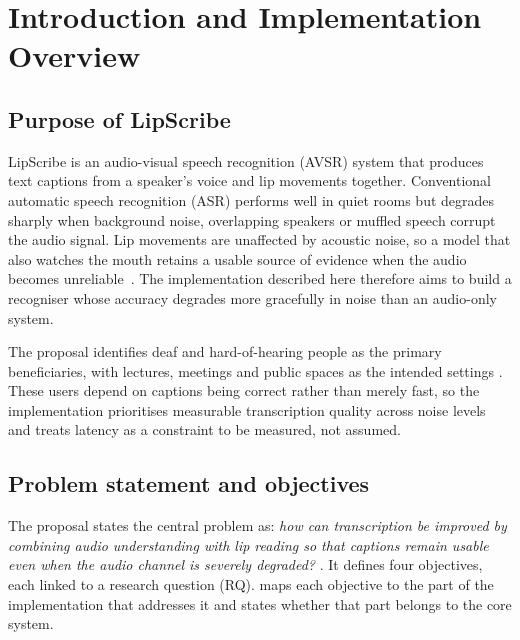 \section{Introduction and Implementation Overview}
\label{sec:intro}

\subsection{Purpose of LipScribe}
LipScribe is an audio-visual speech recognition (AVSR) system that produces
text captions from a speaker's voice and lip movements together. Conventional
automatic speech recognition (ASR) performs well in quiet rooms but degrades
sharply when background noise, overlapping speakers or muffled speech corrupt
the audio signal. Lip movements are unaffected by acoustic noise, so a model
that also watches the mouth retains a usable source of evidence when the audio
becomes unreliable~\cite{li2023,afouras2022}. The implementation described here
therefore aims to build a recogniser whose accuracy degrades more gracefully in
noise than an audio-only system.

The proposal identifies deaf and hard-of-hearing people as the primary
beneficiaries, with lectures, meetings and public spaces as the intended
settings \spec. These users depend on captions being correct rather than merely
fast, so the implementation prioritises measurable transcription quality across
noise levels and treats latency as a constraint to be measured, not assumed.

\subsection{Problem statement and objectives}
The proposal states the central problem as: \emph{how can transcription be
improved by combining audio understanding with lip reading so that captions
remain usable even when the audio channel is severely degraded?} \spec. It
defines four objectives, each linked to a research question (RQ). 
maps each objective to the part of the implementation that addresses it and
states whether that part belongs to the core system.

